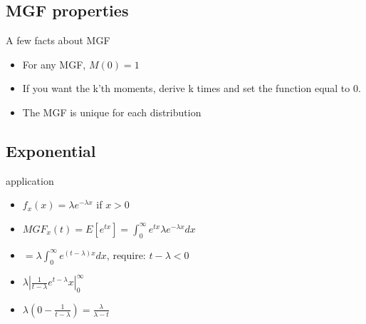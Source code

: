\documentclass{beamer}
\numberwithin{equation}{section}
\begin{document}
\subsection{MGF properties}
\begin{frame}{A few facts about MGF}
\begin{itemize}
    \item For any MGF, $M(0)=1$
    \item If you want the k'th moments, derive k times and set the function equal to 0. 
    \item The MGF is unique for each distribution
\end{itemize}
\end{frame}

\subsection{Exponential}
\begin{frame}{application}
\begin{itemize}
    \item $f_x(x) = \lambda e^{-\lambda x}$ if $x>0$
    \item $MGF_x(t) = E[e^{tx}]= \int^{\infty}_0 e^{tx} \lambda e^{-\lambda x} dx$
    \item $= \lambda \int_0^{\infty} e^{(t-\lambda)x}dx$, require: $t-\lambda < 0$ %
    \item $\lambda |\frac{1}{t-\lambda}e^{t-\lambda}x|_0^{\infty}$
    \item $\lambda (0-\frac{1}{t-\lambda})=\frac{\lambda}{\lambda - t}$
\end{itemize}
\end{frame}


%
\end{document}
